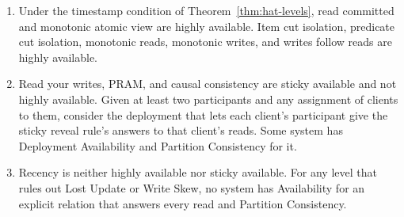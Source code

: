 \begin{theorem}
\label{thm:hat-taxonomy}
\leavevmode
\begin{enumerate}
  \item Under the timestamp condition of Theorem~\ref{thm:hat-levels}, read
        committed and monotonic atomic view are highly available.  Item cut
        isolation, predicate cut isolation, monotonic reads, monotonic
        writes, and writes follow reads are highly available.
  \item Read your writes, PRAM, and causal consistency are sticky available
        and not highly available.  Given at least two participants and any
        assignment of clients to them, consider the deployment that lets each
        client's participant give the sticky reveal rule's answers to that
        client's reads.  Some system has Deployment Availability and Partition
        Consistency for it.
  \item Recency is neither highly available nor sticky available.  For any
        level that rules out Lost Update or Write Skew, no system has
        Availability for an explicit relation that answers every read and
        Partition Consistency.
\end{enumerate}
\end{theorem}


